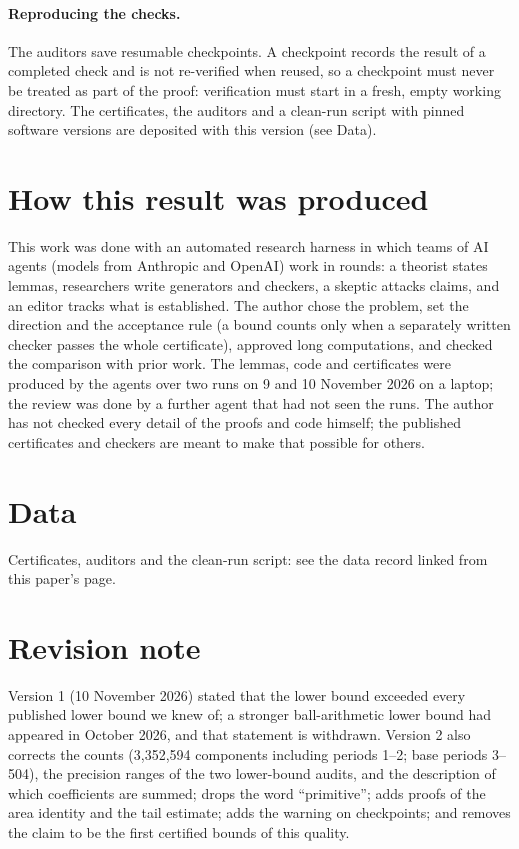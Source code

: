 \documentclass[11pt]{article}
\begin{document}
\paragraph{Reproducing the checks.} The auditors save resumable checkpoints. A checkpoint records the result of a completed check and is not re-verified when reused, so a checkpoint must never be treated as part of the proof: verification must start in a fresh, empty working directory. The certificates, the auditors and a clean-run script with pinned software versions are deposited with this version (see Data).

\section{How this result was produced}

This work was done with an automated research harness in which teams of AI agents (models from Anthropic and OpenAI) work in rounds: a theorist states lemmas, researchers write generators and checkers, a skeptic attacks claims, and an editor tracks what is established. The author chose the problem, set the direction and the acceptance rule (a bound counts only when a separately written checker passes the whole certificate), approved long computations, and checked the comparison with prior work. The lemmas, code and certificates were produced by the agents over two runs on 9 and 10 November 2026 on a laptop; the review was done by a further agent that had not seen the runs. The author has not checked every detail of the proofs and code himself; the published certificates and checkers are meant to make that possible for others.

\section*{Data}

Certificates, auditors and the clean-run script: see the data record linked from this paper's page.

\section*{Revision note}

Version 1 (10 November 2026) stated that the lower bound exceeded every published lower bound we knew of; a stronger ball-arithmetic lower bound \cite{sciencejournal2026} had appeared in October 2026, and that statement is withdrawn. Version 2 also corrects the counts (3,352,594 components including periods 1--2; base periods 3--504), the precision ranges of the two lower-bound audits, and the description of which coefficients are summed; drops the word ``primitive''; adds proofs of the area identity and the tail estimate; adds the warning on checkpoints; and removes the claim to be the first certified bounds of this quality.



\end{document}
